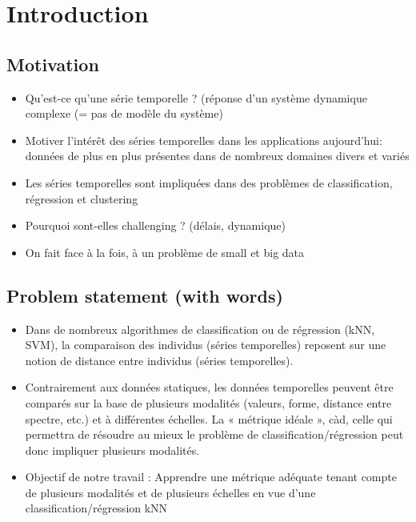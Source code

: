 \chapter*{Introduction}
\label{chap:introduction}

\section*{Motivation}
\begin{itemize}
	\item Qu’est-ce qu’une série temporelle ? (réponse d’un système dynamique complexe (= pas de modèle du système)
	\item Motiver l’intérêt des séries temporelles dans les applications aujourd’hui:  données de plus en plus présentes dans de nombreux domaines divers et variés
	\item Les séries temporelles sont impliquées dans des problèmes de classification, régression et clustering
	\item Pourquoi sont-elles challenging ? (délais, dynamique)
	\item On fait face à la fois, à un problème de small et big data
\end{itemize}


\section*{Problem statement (with words)}
\begin{itemize}
	\item Dans de nombreux algorithmes de classification ou de régression (kNN, SVM), la comparaison des individus (séries temporelles) reposent sur une notion de distance entre individus (séries temporelles).
	\item Contrairement aux données statiques, les données temporelles peuvent être comparés sur la base de plusieurs modalités (valeurs, forme, distance entre spectre, etc.) et à différentes échelles. La « métrique idéale », càd, celle qui permettra de résoudre au mieux le problème de classification/régression peut donc impliquer plusieurs modalités.
	\item Objectif de notre travail : Apprendre une métrique adéquate tenant compte de plusieurs modalités et de plusieurs échelles en vue d’une classification/régression kNN
\end{itemize}

